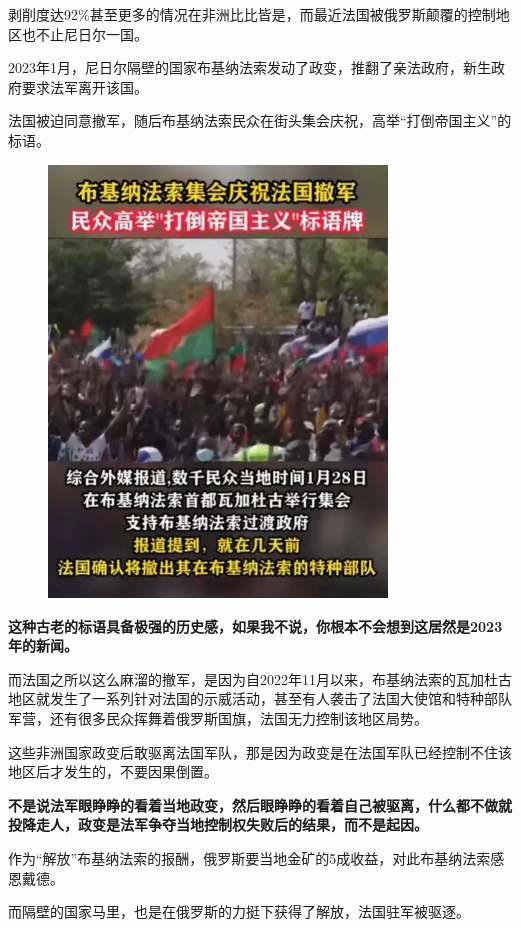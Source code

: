 \documentclass[UTF8, 11pt, oneside]{ctexart}
\newcommand{\zd}[1]{\textbf{\textcolor[RGB]{123,12,0}{#1}}} %
\begin{document}
剥削度达92\%甚至更多的情况在非洲比比皆是，而最近法国被俄罗斯颠覆的控制地区也不止尼日尔一国。

2023年1月，尼日尔隔壁的国家布基纳法索发动了政变，推翻了亲法政府，新生政府要求法军离开该国。

法国被迫同意撤军，随后布基纳法索民众在街头集会庆祝，高举“打倒帝国主义”的标语。

\begin{figure}[H]
    \centering
    \includegraphics[width=9cm]{2024-08-08-003.jpg}
\end{figure}

\zd{这种古老的标语具备极强的历史感，如果我不说，你根本不会想到这居然是2023年的新闻。}

而法国之所以这么麻溜的撤军，是因为自2022年11月以来，布基纳法索的瓦加杜古地区就发生了一系列针对法国的示威活动，甚至有人袭击了法国大使馆和特种部队军营，还有很多民众挥舞着俄罗斯国旗，法国无力控制该地区局势。

这些非洲国家政变后敢驱离法国军队，那是因为政变是在法国军队已经控制不住该地区后才发生的，不要因果倒置。

\zd{不是说法军眼睁睁的看着当地政变，然后眼睁睁的看着自己被驱离，什么都不做就投降走人，政变是法军争夺当地控制权失败后的结果，而不是起因。}

作为“解放”布基纳法索的报酬，俄罗斯要当地金矿的5成收益，对此布基纳法索感恩戴德。

而隔壁的国家马里，也是在俄罗斯的力挺下获得了解放，法国驻军被驱逐。
\end{document}
